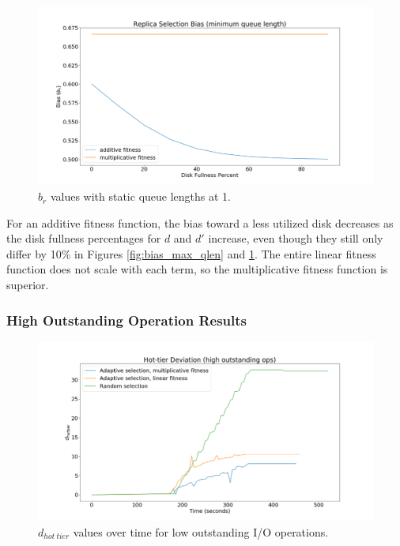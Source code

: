 \documentclass[12pt]{article}
\begin{document}
    \begin{figure}[htbp]
      \centering
      \includegraphics[scale=0.32]{images/replica_selection_bias_min_qlen.png} 
      \caption{$b_r$ values with static queue lengths at 1.}
      \label{fig:bias_min_qlen}
    \end{figure}

    For an additive fitness function, the bias toward a less utilized disk
    decreases as the disk fullness percentages for $d$ and $d'$ increase, even
    though they still only differ by 10\% in Figures \ref{fig:bias_max_qlen}
    and \ref{fig:bias_min_qlen}. The entire linear fitness function does not
    scale with each term, so the multiplicative fitness function is superior.

    \subsubsection{High Outstanding Operation Results}
    \label{sec:high-outstanding-ops}

    \begin{figure}[htbp]
      \centering
      \includegraphics[scale=0.32]{images/high_outstanding_exp.png} 
      \caption{$d_{hot\ tier}$ values over time for low outstanding I/O
               operations.}
      \label{fig:high_outstanding_tier_disparity}
    \end{figure}
\end{document}
